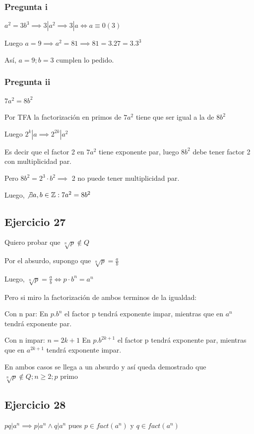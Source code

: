 \subsubsection{Pregunta i}

$ a^2 = 3b^3 \implies 3|a^2 \implies 3|a \iff a \equiv 0(3)$

Luego $ a = 9 \implies a^2 = 81 \implies 81 = 3.27 = 3.3^3$  

Así, $ a = 9; b = 3 $ cumplen lo pedido.

\subsubsection{Pregunta ii}
$ 7a^2 = 8b^2 $

Por TFA la factorización en primos de $ 7a^2 $ tiene que ser igual a la de $ 8b^2 $

Luego $ 2^k | a \implies 2^{2k} | a^2 $

Es decir que el factor 2 en $ 7a^2 $ tiene exponente par, luego $ 8b^2 $ debe tener factor 2 con multiplicidad par.

Pero $ 8b^2 = 2^3 \cdot b^2 \implies $ 2 no puede tener multiplicidad par.

Luego, $ \not \exists a,b \in \mathbb{Z}: 7a^2 = 8b^2 $

\subsection{Ejercicio 27}
Quiero probar que $ \sqrt[n]{p} \not \in Q$

Por el absurdo, supongo que $ \sqrt[n]{p} = \frac{a}{b} $

Luego, $ \sqrt[n]{p} = \frac{a}{b} \iff p \cdot b^n = a^n $

Pero si miro la factorización de ambos terminos de la igualdad:

Con n par: En $ p.b^n $ el factor p tendrá exponente impar, mientras que en $ a^n $ tendrá exponente par.

Con n impar: $ n = 2k+1 $ En $ p.b^{2k+1} $ el factor p tendrá exponente par, mientras que en $ a^{2k+1} $ tendrá exponente impar.

En ambos casos se llega a un absurdo y así queda demostrado que $ \sqrt[n]{p} \not \in Q; n\geq 2; p \text{ primo} $

\subsection{Ejercicio 28}
$ pq|a^n \implies p|a^n \wedge q|a^n $ pues $ p\in fact(a^n) $ y $ q\in fact(a^n) $

